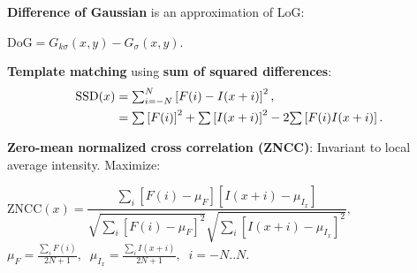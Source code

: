 \documentclass[landscape]{article}
\newcommand{\vmspace}{\vspace{-7pt}}
\newcommand{\vpspace}{\vspace{5pt}}
\begin{document}
\begin{multicols}{3}
\vpspace

\begin{minipage}{\columnwidth}
  \textbf{Difference of Gaussian} is an approximation of LoG:
  \vmspace
  \begin{center}
    $\mathrm{DoG} = G_{k\sigma}(x, y) - G_\sigma(x, y).
    $
  \end{center}
\end{minipage}

\vpspace

\begin{minipage}{\columnwidth}
  \textbf{Template matching} using \textbf{sum of squared differences}:
  \vmspace
  \vspace{-3pt}
  \begin{equation*}
    \begin{split}
      \mathrm{SSD}(x) &= \mathsmaller\sum\nolimits_{i=-N}^N \left[ F(i) - I(x+i)
      \right]^2,\\
      &= \mathsmaller\sum \left[ F(i) \right]^2 +
      \mathsmaller\sum \left[ I(x+i) \right]^2 -
      2 \mathsmaller\sum \left[ F(i) I(x+i) \right].
    \end{split}
  \end{equation*}
\end{minipage}

\vpspace

\begin{minipage}{\columnwidth}
  \textbf{Zero-mean normalized cross correlation (ZNCC)}: Invariant to local
  average intensity. Maximize:
  \vmspace
  \begin{center}
  $
  \mathrm{ZNCC}(x) = \dfrac{\sum_i
    \left[F(i)- \mu_F\right] \left[I(x + i) - \mu_{I_x} \right]}
  {
    \sqrt{\sum_i \left[F(i) - \mu_F\right]^2}
    \sqrt{\sum_i \left[I(x+i) - \mu_{I_x}\right]^2}
  },
    $\\[3pt]
  $
    \mu_F = \frac{\sum_i F(i)}{2N + 1},\;\;
    \mu_{I_x} = \frac{\sum_i I(x+i)}{2N + 1},\;\;
    i=-N..N.
  $
  \end{center}
\end{minipage}

\vpspace


\end{multicols}
\end{document}
